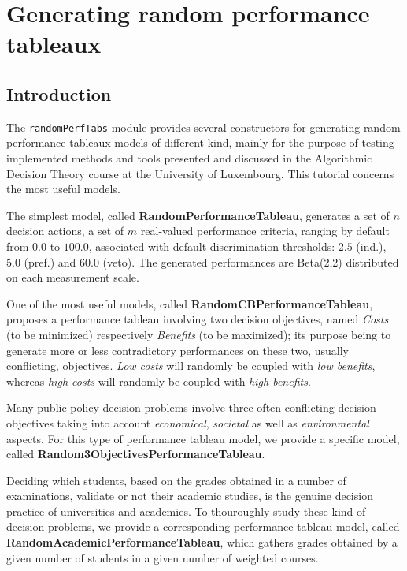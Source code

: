 \chapter{Generating random performance tableaux}
\label{sec:5}



\section{Introduction}
\label{sec:5.1}

The {\tt randomPerfTabs} module provides several constructors for generating random performance tableaux models of different kind, mainly for the purpose of testing implemented methods and tools presented and discussed in the Algorithmic Decision Theory course at the University of Luxembourg. This tutorial concerns the most useful models.

The simplest model, called \textbf{RandomPerformanceTableau}, generates a set of $n$ decision actions, a set of $m$ real-valued performance criteria, ranging by default from $0.0$ to $100.0$, associated with default discrimination thresholds: $2.5$ (ind.), $5.0$ (pref.) and $60.0$ (veto). The generated performances are Beta(2,2) distributed on each measurement scale.

One of the most useful models, called \textbf{RandomCBPerformanceTableau}, proposes a performance tableau involving two decision objectives, named \emph{Costs} (to be minimized) respectively \emph{Benefits} (to be maximized); its purpose being to generate more or less contradictory performances on these two, usually conflicting, objectives. \emph{Low costs} will randomly be coupled with \emph{low benefits}, whereas \emph{high costs} will randomly be coupled with \emph{high benefits}.

Many public policy decision problems involve three often conflicting decision objectives taking into account \emph{economical}, \emph{societal} as well as \emph{environmental} aspects. For this type of performance tableau model, we provide a specific model, called \textbf{Random3ObjectivesPerformanceTableau}.

Deciding which students, based on the grades obtained in a number of examinations, validate or not their academic studies, is the genuine decision practice of universities and academies. To thouroughly study these kind of decision problems, we provide a corresponding performance tableau model, called \textbf{RandomAcademicPerformanceTableau}, which gathers grades obtained by a given number of students in a given number of weighted courses.    

